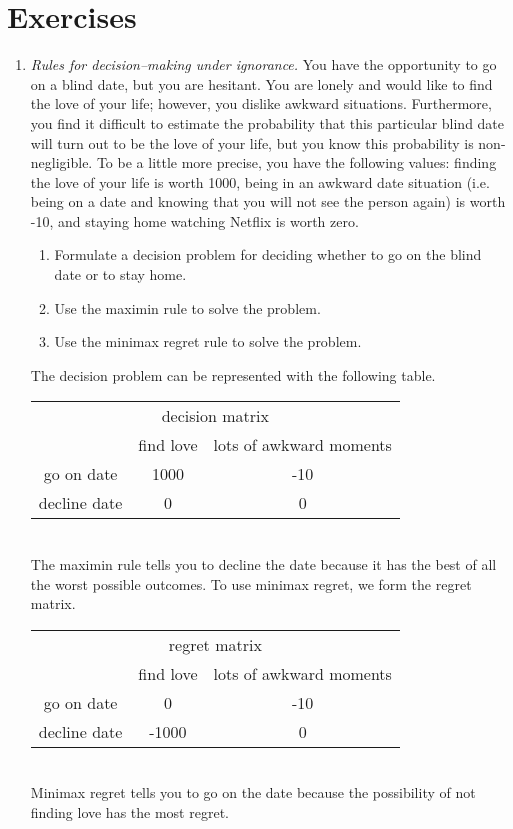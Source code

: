 \section{Exercises}
\begin{enumerate}

\item \emph{Rules for decision--making under ignorance.}
  You have the opportunity to go on a
  blind date, but you are hesitant.  You are lonely and would like to
  find the love of your life; however, you dislike awkward
  situations. Furthermore, you find it difficult to estimate the
  probability that this particular blind date will turn out to be the
  love of your life, but you know this probability is
  non-negligible. To be a little more precise, you have the following
  values: finding the love of your life is worth 1000, being in an
  awkward date situation (i.e. being on a date and knowing that you
  will not see the person again) is worth -10, and staying home
  watching Netflix is worth zero.

\begin{enumerate}
\item Formulate a decision problem for deciding whether to go on the
blind date or to stay home.
\item Use the maximin rule to solve the problem.
\item Use the minimax regret rule to solve the problem.
\end{enumerate}

\begin{solution}
\bs The decision problem can be represented with the following table.
\\[.1in]
\begin{tabular}{ccc}
 \multicolumn{3}{c}{decision matrix} \\
 & find love & lots of awkward moments \\ \cline{2-3}
go on date & 1000 & -10 \\
decline date & 0 & 0 
\end{tabular}
\\[.1in] 
The maximin rule tells you to decline the date because it has
the best of all the worst possible outcomes. To use minimax regret, we
form the regret matrix.  \\[.1in]
\begin{tabular}{ccc}
 \multicolumn{3}{c}{regret matrix} \\
 & find love & lots of awkward moments \\ \cline{2-3}
go on date & 0 & -10 \\
decline date & -1000 & 0
\end{tabular}
\\[.1in] Minimax regret tells you to go on the date because the
possibility of not finding love has the most regret.
\end{solution}


\end{enumerate}
